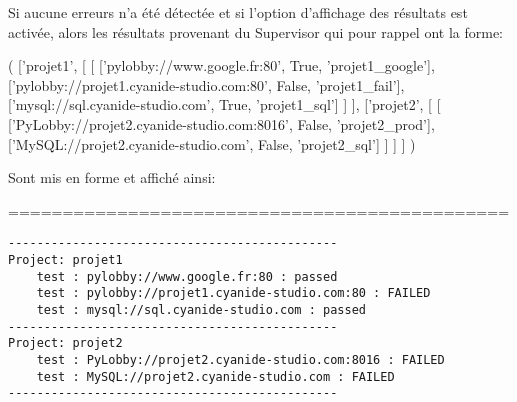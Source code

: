 Si aucune erreurs n'a été détectée et si l'option d'affichage des résultats est activée, alors les résultats provenant du Supervisor qui pour rappel ont la forme:

\begin{python}
(
    ['projet1', 
        [
            [
                ['pylobby://www.google.fr:80', True, 'projet1_google'],
                ['pylobby://projet1.cyanide-studio.com:80', False, 'projet1_fail'], 
                ['mysql://sql.cyanide-studio.com', True, 'projet1_sql']
            ]
        ], 
    ['projet2', 
        [
            [
                ['PyLobby://projet2.cyanide-studio.com:8016', False, 'projet2_prod'], 
                ['MySQL://projet2.cyanide-studio.com', False, 'projet2_sql']
            ]
        ]
    ]
)
\end{python} 

Sont mis en forme et affiché ainsi:

==============================================

\begin{lstlisting}
----------------------------------------------
Project: projet1
    test : pylobby://www.google.fr:80 : passed
    test : pylobby://projet1.cyanide-studio.com:80 : FAILED
    test : mysql://sql.cyanide-studio.com : passed
----------------------------------------------
Project: projet2
    test : PyLobby://projet2.cyanide-studio.com:8016 : FAILED
    test : MySQL://projet2.cyanide-studio.com : FAILED
----------------------------------------------
\end{lstlisting}

